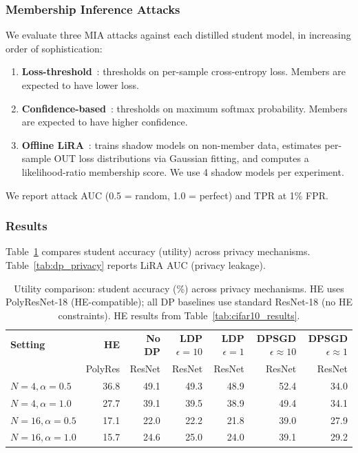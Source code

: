 \subsubsection{Membership Inference Attacks}
 
We evaluate three MIA attacks against each distilled student model, in increasing order of sophistication:
 
\begin{enumerate}
    \item \textbf{Loss-threshold}~\cite{yeom2018privacy}: thresholds on per-sample cross-entropy loss. Members are expected to have lower loss.
    \item \textbf{Confidence-based}~\cite{salem2019ml}: thresholds on maximum softmax probability. Members are expected to have higher confidence.
    \item \textbf{Offline LiRA}~\cite{carlini2022membership}: trains shadow models on non-member data, estimates per-sample OUT loss distributions via Gaussian fitting, and computes a likelihood-ratio membership score. We use 4 shadow models per experiment.
\end{enumerate}
 
We report attack AUC (0.5 = random, 1.0 = perfect) and TPR at 1\% FPR.
 
\subsubsection{Results}
 
Table~\ref{tab:dp_utility} compares student accuracy (utility) across privacy mechanisms. Table~\ref{tab:dp_privacy} reports LiRA AUC (privacy leakage).
 
\begin{table}[h]
\centering
\caption{Utility comparison: student accuracy (\%) across privacy mechanisms. HE uses PolyResNet-18 (HE-compatible); all DP baselines use standard ResNet-18 (no HE constraints). HE results from Table~\ref{tab:cifar10_results}.}
\label{tab:dp_utility}
\begin{tabular}{l|r|r|r|r|r|r}
\hline
\textbf{Setting} & \textbf{HE} & \textbf{No DP} & \textbf{LDP} $\epsilon{=}10$ & \textbf{LDP} $\epsilon{=}1$ & \textbf{DPSGD} $\epsilon{\approx}10$ & \textbf{DPSGD} $\epsilon{\approx}1$ \\
 & \small{PolyRes} & \small{ResNet} & \small{ResNet} & \small{ResNet} & \small{ResNet} & \small{ResNet} \\
\hline
$N{=}4, \alpha{=}0.5$  & 36.8 & 49.1 & 49.3 & 48.9 & 52.4 & 34.0 \\
$N{=}4, \alpha{=}1.0$  & 27.7 & 39.1 & 39.5 & 38.9 & 49.4 & 34.1 \\
$N{=}16, \alpha{=}0.5$ & 17.1 & 22.0 & 22.2 & 21.8 & 39.0 & 27.9 \\
$N{=}16, \alpha{=}1.0$ & 15.7 & 24.6 & 25.0 & 24.0 & 39.1 & 29.2 \\
\hline
\end{tabular}
\end{table}

